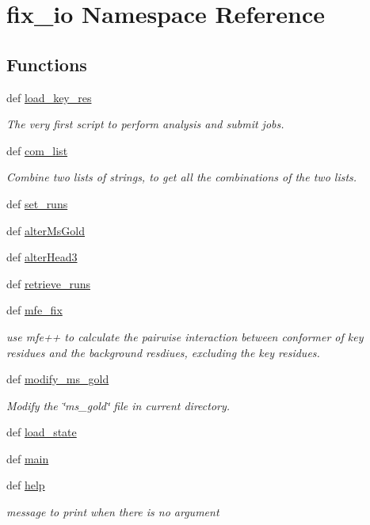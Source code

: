 \hypertarget{namespacefix__io}{\section{fix\-\_\-io Namespace Reference}
\label{namespacefix__io}
}
\subsection*{Functions}
\begin{DoxyCompactItemize}
\item 
def \hyperlink{namespacefix__io_a5bc34b7086b543ec38ae5203ed9d5a85}{load\-\_\-key\-\_\-res}
\begin{DoxyCompactList}\small\item\em The very first script to perform analysis and submit jobs. \end{DoxyCompactList}\item 
def \hyperlink{namespacefix__io_a7ed9a97a0986ccb40e5c76ff53ffced6}{com\-\_\-list}
\begin{DoxyCompactList}\small\item\em Combine two lists of strings, to get all the combinations of the two lists. \end{DoxyCompactList}\item 
def \hyperlink{namespacefix__io_af658f44a2697c8d9f96f4e024d1c121f}{set\-\_\-runs}
\item 
def \hyperlink{namespacefix__io_a110ab532afef24472226012aece7a722}{alter\-Ms\-Gold}
\item 
def \hyperlink{namespacefix__io_a5f4a2cb4cbf915e8bf190ffd18da5079}{alter\-Head3}
\item 
def \hyperlink{namespacefix__io_a794efe7e78fe9e9235ca0acc1b611324}{retrieve\-\_\-runs}
\item 
def \hyperlink{namespacefix__io_aec1916961dafab6aec4531aa98b9334c}{mfe\-\_\-fix}
\begin{DoxyCompactList}\small\item\em use mfe++ to calculate the pairwise interaction between conformer of key residues and the background resdiues, excluding the key residues. \end{DoxyCompactList}\item 
def \hyperlink{namespacefix__io_a767858169d4974b13764ef6bfe4bd7a2}{modify\-\_\-ms\-\_\-gold}
\begin{DoxyCompactList}\small\item\em Modify the \char`\"{}ms\-\_\-gold\char`\"{} file in current directory. \end{DoxyCompactList}\item 
def \hyperlink{namespacefix__io_ad3c7a14a112ec50900fdc6a4cf484f88}{load\-\_\-state}
\item 
def \hyperlink{namespacefix__io_ad7c7d09c9b1de0720a7989578e10cf45}{main}
\item 
def \hyperlink{namespacefix__io_a9059d59aa320b33c63320e9e2f2916fd}{help}
\begin{DoxyCompactList}\small\item\em message to print when there is no argument \end{DoxyCompactList}\end{DoxyCompactItemize}


